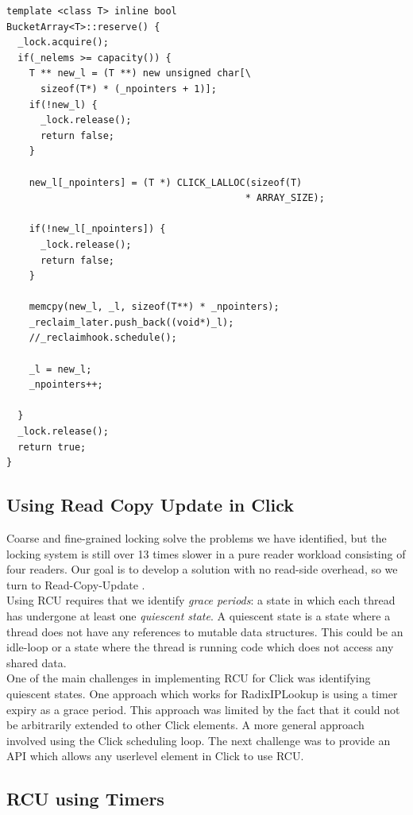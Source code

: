 \documentclass[12pt,a4paper]{article}
\begin{document}
\begin{lstlisting}[caption=Locking in reserve(), label=bucketvectorreservelisting]
template <class T> inline bool
BucketArray<T>::reserve() {
  _lock.acquire();
  if(_nelems >= capacity()) {
    T ** new_l = (T **) new unsigned char[\
      sizeof(T*) * (_npointers + 1)];
    if(!new_l) {
      _lock.release();
      return false;
    }
    
    new_l[_npointers] = (T *) CLICK_LALLOC(sizeof(T) 
                                          * ARRAY_SIZE);
    
    if(!new_l[_npointers]) {
      _lock.release();
      return false;
    }
    
    memcpy(new_l, _l, sizeof(T**) * _npointers);
    _reclaim_later.push_back((void*)_l);
    //_reclaimhook.schedule();

    _l = new_l;
    _npointers++;
    
  }
  _lock.release();
  return true;
}
\end{lstlisting}
\subsection{Using Read Copy Update in Click}
\label{sec:rcu}
Coarse and fine-grained locking solve the problems we have identified, but the locking system is still over 13 times slower in a pure reader workload consisting of four readers. Our goal is to develop a solution with no read-side overhead, so we turn to Read-Copy-Update \cite{readcopyupdate}.\\

Using RCU requires that we identify \emph{grace periods}: a state in which each thread has undergone at least one \emph{quiescent state}. A quiescent state is a state where a thread does not have any references to mutable data structures. This could be an idle-loop or a state where the thread is running code which does not access any shared data.\\

One of the main challenges in implementing RCU for Click was identifying quiescent states. One approach which works for RadixIPLookup  is using a timer expiry as a grace period. This approach was limited by the fact that it could not be arbitrarily extended to other Click elements. A more general approach involved using the Click scheduling loop. The next challenge was to provide an API which allows any userlevel element in Click to use RCU. 
\subsection{RCU using Timers}\label{sec:rcutimers}
\end{document}
